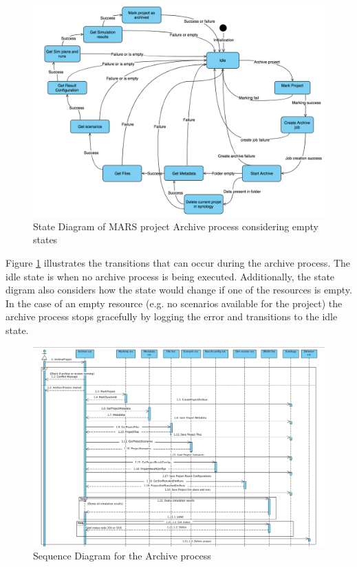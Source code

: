 \begin{figure}[H]
    \centering \includegraphics[scale=0.45]{grafiken/stateArchive.png}
    \caption{State Diagram of MARS project Archive process considering empty states}
    \label{fig:stateArchive}
\end{figure}

Figure \ref{fig:stateArchive} illustrates the transitions that can occur during the archive process. The idle state is when no archive process
is being executed. Additionally, the state digram also considers
how the state would change if one of the resources is empty. In the case of an empty resource (e.g. no scenarios available for the project) the archive
process stops gracefully by logging the error and transitions to the idle state. 

\begin{figure}[H]
    \centering \includegraphics[scale=0.5, angle=90, origin=c]{grafiken/sequenceArchive.png}
    \caption{Sequence Diagram for the Archive process}
    \label{fig:sequenceArchive}
\end{figure}

